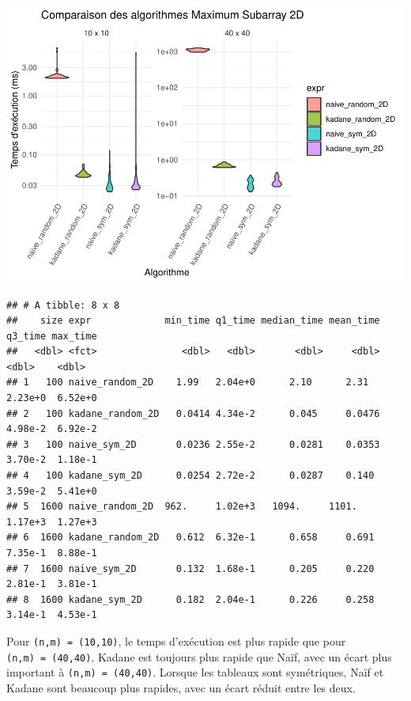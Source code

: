 \documentclass[
]{article}
\begin{document}
\includegraphics{MaxSubarray2D_files/figure-latex/benchmark3-1.pdf}

\begin{verbatim}
## # A tibble: 8 x 8
##    size expr             min_time q1_time median_time mean_time q3_time max_time
##   <dbl> <fct>               <dbl>   <dbl>       <dbl>     <dbl>   <dbl>    <dbl>
## 1   100 naive_random_2D    1.99   2.04e+0      2.10      2.31   2.23e+0  6.52e+0
## 2   100 kadane_random_2D   0.0414 4.34e-2      0.045     0.0476 4.98e-2  6.92e-2
## 3   100 naive_sym_2D       0.0236 2.55e-2      0.0281    0.0353 3.70e-2  1.18e-1
## 4   100 kadane_sym_2D      0.0254 2.72e-2      0.0287    0.140  3.59e-2  5.41e+0
## 5  1600 naive_random_2D  962.     1.02e+3   1094.     1101.     1.17e+3  1.27e+3
## 6  1600 kadane_random_2D   0.612  6.32e-1      0.658     0.691  7.35e-1  8.88e-1
## 7  1600 naive_sym_2D       0.132  1.68e-1      0.205     0.220  2.81e-1  3.81e-1
## 8  1600 kadane_sym_2D      0.182  2.04e-1      0.226     0.258  3.14e-1  4.53e-1
\end{verbatim}

Pour \texttt{(n,m)\ =\ (10,10)}, le temps d'exécution est plus rapide
que pour \texttt{(n,m)\ =\ (40,40)}. Kadane est toujours plus rapide que
Naïf, avec un écart plus important à \texttt{(n,m)\ =\ (40,40)}. Lorsque
les tableaux sont symétriques, Naïf et Kadane sont beaucoup plus
rapides, avec un écart réduit entre les deux.
\end{document}
